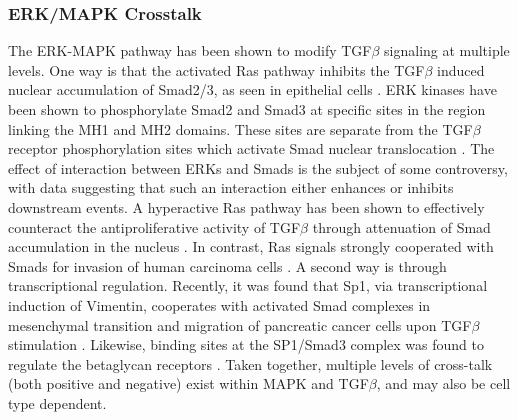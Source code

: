 \subsubsection*{ERK/MAPK Crosstalk}
The ERK-MAPK pathway has been shown to modify TGF$\beta$ signaling at multiple levels.
One way is that the activated Ras pathway inhibits the TGF$\beta$ induced nuclear accumulation of Smad2/3, as seen in epithelial cells \cite{Zhang2009a}.
ERK kinases have been shown to phosphorylate Smad2 and Smad3 at specific sites in the region linking the MH1 and MH2 domains.
These sites are separate from the TGF$\beta$ receptor phosphorylation sites which activate Smad nuclear translocation \cite{Massague2003}.
The effect of interaction between ERKs and Smads is the subject of some controversy, with data suggesting that such an interaction either enhances or inhibits downstream events.
A hyperactive Ras pathway has been shown to effectively counteract the antiproliferative activity of TGF$\beta$ through attenuation of Smad accumulation in the nucleus \cite{Kretzschmar:1999wb}.
In contrast, Ras signals strongly cooperated with Smads for invasion of human carcinoma cells \cite{Oft1996}.
A second way is through transcriptional regulation.
Recently, it was found that Sp1, via transcriptional induction of Vimentin, cooperates with activated Smad complexes in mesenchymal transition and migration of pancreatic cancer cells upon TGF$\beta$ stimulation \cite{Jungert:2007ri}.
Likewise, binding sites at the SP1/Smad3 complex was found to regulate the betaglycan receptors \cite{Lopez-Casillas2003}.
Taken together, multiple levels of cross-talk (both positive and negative) exist within MAPK and TGF$\beta$, and may also be cell type dependent.

